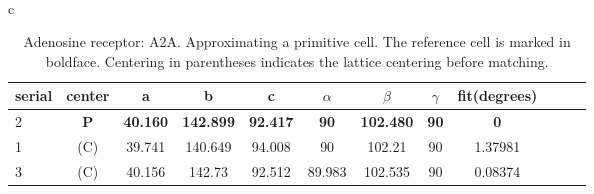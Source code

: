 \documentclass[preprint]{iucr}              %
\numberwithin{equation}{section}
\numberwithin{equation}{section}
\begin{document}
	
	\begin{table}
		\begin{center}
			\caption{Adenosine receptor: A2A. Approximating a primitive cell.   The reference cell	is marked in boldface.  Centering in parentheses indicates the lattice centering before matching.}
			~~\\c

			
			\begin{tabular}{lccccccccccc}
				\toprule
serial&center& a & b & c & $\alpha$ & $\beta$ & $\gamma$ & fit(degrees) 	\\			
\toprule
				2&\textbf{P} & \textbf{40.160} & \textbf{142.899} & \textbf{92.417} & \textbf{90} & \textbf{102.480} & \textbf{90}&\textbf{0}	\\  
1&(C)   & 39.741 & 140.649  & 94.008  & 90 &  102.21  & 90 &  1.37981 \\
3&(C)   & 40.156 & 142.73  & 92.512  & 89.983 & 102.535 & 90 &  0.08374 \\				\bottomrule
			\end{tabular}
		\end{center}
	\label{table:signal2}
	\end{table}

	
	
\end{document}
